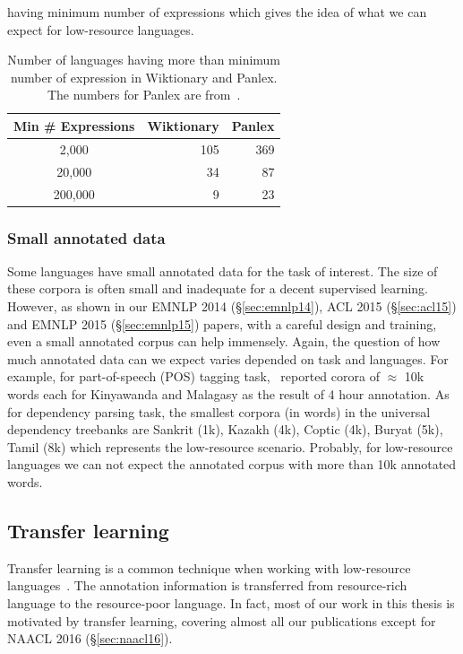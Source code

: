\documentclass[12pt,twoside,final,hidelinks]{ltthesis}
\theoremstyle{definition}
\newcommand\emnlpiv{EMNLP 2014 (\S\ref{sec:emnlp14})}
\newcommand\aclv{ACL 2015 (\S\ref{sec:acl15})}
\newcommand\emnlpv{EMNLP 2015 (\S\ref{sec:emnlp15})}
\newcommand\naaclvi{NAACL 2016 (\S\ref{sec:naacl16})}
\begin{document}
having minimum number of expressions which gives the idea of what we can expect for low-resource languages. 
\begin{table}
\centering
\begin{tabular}{crr}
\toprule
Min \# Expressions & Wiktionary & Panlex \\
\midrule
2,000          & 105        & 369    \\
20,000         & 34         & 87     \\
200,000        & 9          & 23    \\
\bottomrule
\end{tabular}
\caption[Number of languages having more than minimum number of expression in Wiktionary and Panlex]{Number of languages having more than minimum number of expression in Wiktionary and Panlex. The numbers for Panlex are from~\protect{}.}
\label{tab:expression_wik_pan}
\end{table}


\subsubsection{Small annotated data}
Some languages have small annotated data for the task of interest. The size of these corpora is often small and 
inadequate for a decent supervised learning. However, as shown in our \emnlpiv{}, \aclv{} and 
\emnlpv{} papers, with a careful design and training, even a small annotated corpus can help immensely. Again, the question of how much annotated data can we expect varies depended on task and languages. For example, for part-of-speech (POS) tagging task,~ reported corora of $\approx$ 10k words each for Kinyawanda and Malagasy as the result of 4 hour annotation. As for dependency parsing task, the smallest corpora (in words) in the universal dependency treebanks are Sankrit (1k), Kazakh (4k), Coptic (4k), Buryat (5k), Tamil (8k) which represents the low-resource scenario. Probably, for low-resource languages we can not expect the annotated corpus with more than 10k annotated words. 

\subsection{Transfer learning}
Transfer learning is a common technique when working with low-resource 
languages~\cite{TackstromDPMN13,Das:2011,YarowskyAndNgai,duongIJCNLP,Hwa:2005:BPV,P14-1126}. The annotation information is transferred from resource-rich language to the resource-poor language. In fact, most of our work in this thesis is motivated by transfer learning, covering almost all our publications except for \naaclvi. 
\end{document}
